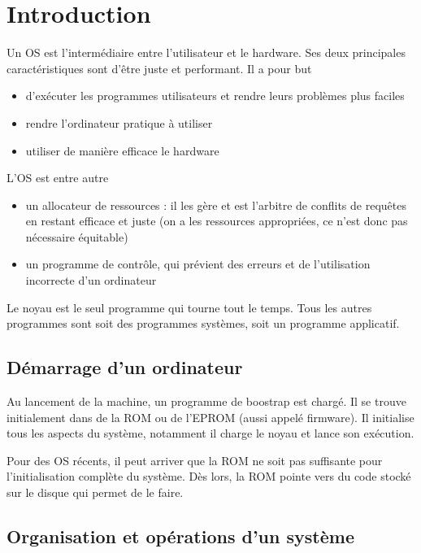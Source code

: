 \chapter{Introduction}

Un OS est l'intermédiaire entre l'utilisateur et le hardware. Ses deux principales caractéristiques sont d'être juste et performant. Il a pour but

\begin{itemize}
	\item d'exécuter les programmes utilisateurs et rendre leurs problèmes plus faciles
	\item rendre l'ordinateur pratique à utiliser
	\item utiliser de manière efficace le hardware
\end{itemize}

L'OS est entre autre

\begin{itemize}
	\item un allocateur de ressources : il les gère et est l'arbitre de conflits de requêtes en restant efficace et juste (on a les ressources appropriées, ce n'est donc pas nécessaire équitable)
	\item un programme de contrôle, qui prévient des erreurs et de l'utilisation incorrecte d'un ordinateur
\end{itemize}

Le noyau est le seul programme qui tourne tout le temps. Tous les autres programmes sont soit des programmes systèmes, soit un programme applicatif.

	\section{Démarrage d'un ordinateur}
	
	Au lancement de la machine, un programme de boostrap est chargé. Il se trouve initialement dans de la ROM ou de l'EPROM (aussi appelé firmware). Il initialise tous les aspects du système, notamment il charge le noyau et lance son exécution.
	
	Pour des OS récents, il peut arriver que la ROM ne soit pas suffisante pour l'initialisation complète du système. Dès lors, la ROM pointe vers du code stocké sur le disque qui permet de le faire.
	
	\section{Organisation et opérations d'un système}
	
